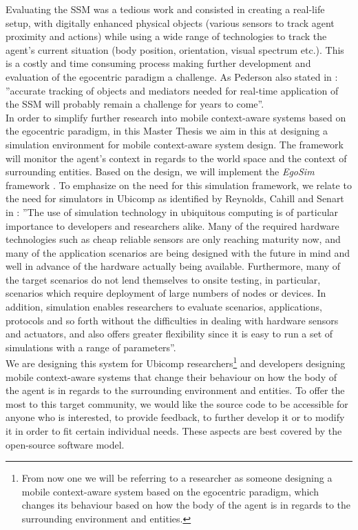 Evaluating the SSM was a tedious work and consisted in creating a real-life setup, with digitally enhanced physical objects (various sensors to track agent proximity and actions) while using a wide range of technologies to track the agent's current situation (body position, orientation, visual spectrum etc.). This is a costly and time consuming process making further development and evaluation of the egocentric paradigm a challenge. As Pederson also stated in \cite{pederson2011situative}: ''accurate tracking of objects and mediators needed for real-time application of the SSM will probably remain a challenge for years to come''.\\

In order to simplify further research into mobile context-aware systems based on the egocentric paradigm, in this Master Thesis we aim in this at designing a simulation environment for mobile context-aware system design. The framework will monitor the agent's context in regards to the world space and the context of surrounding entities. Based on the design, we will implement the \emph{EgoSim} framework \cite{egosim:online}. To emphasize on the need for this simulation framework, we relate to the need for simulators in Ubicomp as identified by Reynolds, Cahill and Senart in \cite{reynolds2006requirements}: ''The use of simulation technology in ubiquitous computing is of particular importance to developers and researchers alike. Many of the required hardware technologies such as cheap reliable sensors are only reaching maturity now, and many of the application scenarios are being designed with the future in mind and well in advance of the hardware actually being available. Furthermore, many of the target scenarios do not lend themselves to onsite testing, in particular, scenarios which require deployment of large numbers of nodes or devices. In addition, simulation enables researchers to evaluate scenarios, applications, protocols and so forth without the difficulties in dealing with hardware sensors and actuators, and also offers greater flexibility since it is easy to run a set of simulations with a range of parameters''.\\

We are designing this system for Ubicomp researchers\footnote{From now one we will be referring to a researcher as someone designing a mobile context-aware system based on the egocentric paradigm, which changes its behaviour based on how the body of the agent is in regards to the surrounding environment and entities.} and developers designing mobile context-aware systems that change their behaviour on how the body of the agent is in regards to the surrounding environment and entities. To offer the most to this target community, we would like the source code to be accessible for anyone who is interested, to provide feedback, to further develop it or to modify it in order to fit certain individual needs. These aspects are best covered by the open-source software model.\\









